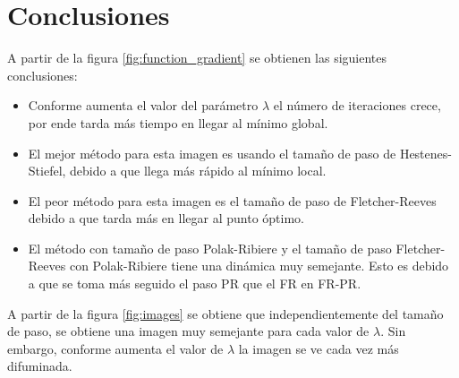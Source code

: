 \section{Conclusiones}

A partir de la figura \ref{fig:function_gradient} se obtienen las siguientes conclusiones:

\begin{itemize}
    \item Conforme aumenta el valor del parámetro $\lambda$ el número de iteraciones crece, por ende tarda más tiempo en llegar al mínimo global.
    \item El mejor método para esta imagen es usando el tamaño de paso de Hestenes-Stiefel, debido a que llega más rápido al mínimo local.
    \item El peor método para esta imagen es el tamaño de paso de Fletcher-Reeves debido a que tarda más en llegar al punto óptimo.
    \item El método con tamaño de paso Polak-Ribiere y el tamaño de paso Fletcher-Reeves con Polak-Ribiere tiene una dinámica muy semejante. Esto es debido a que se toma más seguido el paso PR que el FR en FR-PR.
\end{itemize}

A partir de la figura \ref{fig:images} se obtiene que independientemente del tamaño de paso, se obtiene una imagen muy semejante para cada valor de $\lambda$. Sin embargo, conforme aumenta el valor de $\lambda$ la imagen se ve cada vez más difuminada.